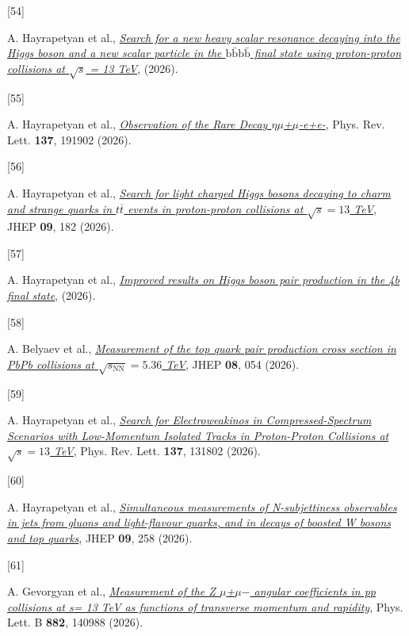 \documentclass[
]{article}
\newlength{\cslhangindent}
\newlength{\csllabelwidth}
\newenvironment{CSLReferences}[2] %
 {\begin{list}{}{%
  \setlength{\itemindent}{0pt}
  \setlength{\leftmargin}{0pt}
  \setlength{\parsep}{0pt}
  \ifodd #1
   \setlength{\leftmargin}{\cslhangindent}
   \setlength{\itemindent}{-1\cslhangindent}
  \fi
  \setlength{\itemsep}{#2\baselineskip}}}
 {\end{list}}
\newcommand{\CSLLeftMargin}[1]{\parbox[t]{\csllabelwidth}{\strut#1\strut}}
\newcommand{\CSLRightInline}[1]{\parbox[t]{\linewidth - \csllabelwidth}{\strut#1\strut}}
\begin{document}
\begin{CSLReferences}{0}{0}
\CSLLeftMargin{{[}54{]} }%
\CSLRightInline{A. Hayrapetyan et al.,
\emph{\href{https://arxiv.org/abs/2605.02848}{{Search for a new heavy
scalar resonance decaying into the Higgs boson and a new scalar particle
in the \(\mathrm{b}\bar{\mathrm{b}}\mathrm{b}\bar{\mathrm{b}}\) final
state using proton-proton collisions at \(\sqrt{s}\) = 13 TeV}}},
(2026).}

\CSLLeftMargin{{[}55{]} }%
\CSLRightInline{A. Hayrapetyan et al.,
\emph{\href{https://doi.org/10.1103/dv54-jq8p}{{Observation of the Rare
Decay {\(\eta\)}{\textrightarrow}{\(\mu\)}+{\(\mu\)}-e+e-}}}, Phys. Rev.
Lett. \textbf{137}, 191902 (2026).}

\CSLLeftMargin{{[}56{]} }%
\CSLRightInline{A. Hayrapetyan et al.,
\emph{\href{https://doi.org/10.1007/JHEP09(2026)182}{{Search for light
charged Higgs bosons decaying to charm and strange quarks in
\(t\overline{t}\) events in proton-proton collisions at \(\sqrt{s}=13\)
TeV}}}, JHEP \textbf{09}, 182 (2026).}

\CSLLeftMargin{{[}57{]} }%
\CSLRightInline{A. Hayrapetyan et al.,
\emph{\href{https://arxiv.org/abs/2604.27044}{{Improved results on Higgs
boson pair production in the 4b final state}}}, (2026).}

\CSLLeftMargin{{[}58{]} }%
\CSLRightInline{A. Belyaev et al.,
\emph{\href{https://doi.org/10.1007/JHEP08(2026)054}{{Measurement of the
top quark pair production cross section in PbPb collisions at
\(\sqrt{s_{\mathrm{NN}}}=5.36\) TeV}}}, JHEP \textbf{08}, 054 (2026).}

\CSLLeftMargin{{[}59{]} }%
\CSLRightInline{A. Hayrapetyan et al.,
\emph{\href{https://doi.org/10.1103/g4ym-rzkt}{{Search for
Electroweakinos in Compressed-Spectrum Scenarios with Low-Momentum
Isolated Tracks in Proton-Proton Collisions at \(\sqrt{s}=13\) TeV}}},
Phys. Rev. Lett. \textbf{137}, 131802 (2026).}

\CSLLeftMargin{{[}60{]} }%
\CSLRightInline{A. Hayrapetyan et al.,
\emph{\href{https://doi.org/10.1007/JHEP09(2026)258}{{Simultaneous
measurements of N-subjettiness observables in jets from gluons and
light-flavour quarks, and in decays of boosted W bosons and top
quarks}}}, JHEP \textbf{09}, 258 (2026).}

\CSLLeftMargin{{[}61{]} }%
\CSLRightInline{A. Gevorgyan et al.,
\emph{\href{https://doi.org/10.1016/j.physletb.2026.140988}{{Measurement
of the Z {\textrightarrow}{\(\mu\)}+{\(\mu\)}{\(-\)} angular
coefficients in pp collisions at s= 13 TeV as functions of transverse
momentum and rapidity}}}, Phys. Lett. B \textbf{882}, 140988 (2026).}


\end{CSLReferences}
\end{document}
